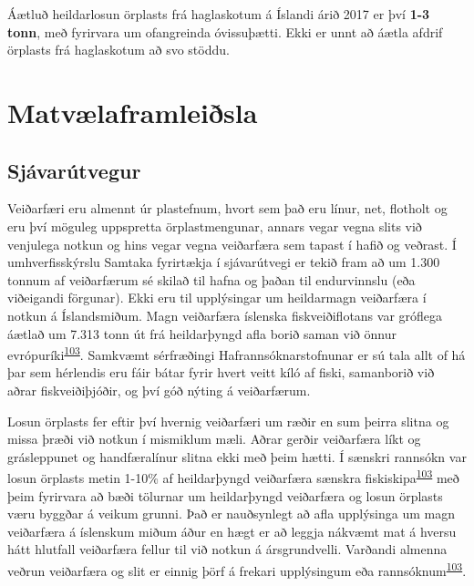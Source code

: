 \documentclass[icelandic,]{book}
\begin{document}
Áætluð heildarlosun örplasts frá haglaskotum á Íslandi árið 2017 er því \textbf{1-3 tonn}, með fyrirvara um ofangreinda óvissuþætti. Ekki er unnt að áætla afdrif örplasts frá haglaskotum að svo stöddu.

\hypertarget{matvlaframleisla}{%
\section*{Matvælaframleiðsla}\label{matvlaframleisla}}

\hypertarget{sjavarutvegur}{%
\subsection*{Sjávarútvegur}\label{sjavarutvegur}}

Veiðarfæri eru almennt úr plastefnum, hvort sem það eru línur, net, flotholt og eru því möguleg uppspretta örplastmengunar, annars vegar vegna slits við venjulega notkun og hins vegar vegna veiðarfæra sem tapast í hafið og veðrast. Í umhverfisskýrslu Samtaka fyrirtækja í sjávarútvegi er tekið fram að um 1.300 tonnum af veiðarfærum sé skilað til hafna og þaðan til endurvinnslu (eða viðeigandi förgunar). Ekki eru til upplýsingar um heildarmagn veiðarfæra í notkun á Íslandsmiðum. Magn veiðarfæra íslenska fiskveiðiflotans var gróflega áætlað um 7.313 tonn út frá heildarþyngd afla borið saman við önnur evrópuríki\textsuperscript{\protect\hyperlink{ref-Hann2018}{103}}. Samkvæmt sérfræðingi Hafrannsóknarstofnunar er sú tala allt of há þar sem hérlendis eru fáir bátar fyrir hvert veitt kíló af fiski, samanborið við aðrar fiskveiðiþjóðir, og því góð nýting á veiðarfærum.

Losun örplasts fer eftir því hvernig veiðarfæri um ræðir en sum þeirra slitna og missa þræði við notkun í mismiklum mæli. Aðrar gerðir veiðarfæra líkt og grásleppunet og handfæralínur slitna ekki með þeim hætti. Í sænskri rannsókn var losun örplasts metin 1-10\% af heildarþyngd veiðarfæra sænskra fiskiskipa\textsuperscript{\protect\hyperlink{ref-Hann2018}{103}} með þeim fyrirvara að bæði tölurnar um heildarþyngd veiðarfæra og losun örplasts væru byggðar á veikum grunni. Það er nauðsynlegt að afla upplýsinga um magn veiðarfæra á íslenskum miðum áður en hægt er að leggja nákvæmt mat á hversu hátt hlutfall veiðarfæra fellur til við notkun á ársgrundvelli. Varðandi almenna veðrun veiðarfæra og slit er einnig þörf á frekari upplýsingum eða rannsóknum\textsuperscript{\protect\hyperlink{ref-Hann2018}{103}}.
\end{document}
